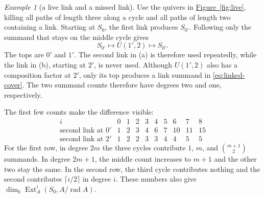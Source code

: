 \documentclass[reqno]{amsart}
\numberwithin{equation}{section}
\theoremstyle{definition}
\theoremstyle{remark}
\newtheorem{example}[theorem]{Example}
\DeclareMathOperator{\Ext}{Ext}
\DeclareMathOperator{\rad}{rad}
\newcommand{\kk}{\Bbbk}
\newcommand{\kdim}{\dim_{\kk}}
\newcommand{\figref}[1]{\hyperref[#1]{Figure~\ref*{#1}}}
\begin{document}
\begin{example}[a live link and a missed link]\label{ex:live}
Use the quivers in \figref{fig:live}, killing all paths of length three along a cycle and all paths of length two containing a link. Starting at \(S_0\), the first link produces \(S_{0'}\). Following only the summand that stays on the middle cycle gives
\[
S_{0'}\longmapsto U(1',2)\longmapsto S_{0'}.
\]
The tops are \(0'\) and \(1'\). The second link in (a) is therefore used repeatedly, while the link in (b), starting at \(2'\), is never used. Although \(U(1',2)\) also has a composition factor at \(2'\), only its top produces a link summand in \eqref{eq:linked-cover}. The two summand counts therefore have degrees two and one, respectively.

The first few counts make the difference visible:
\[
\begin{array}{c|rrrrrrrrr}
i&0&1&2&3&4&5&6&7&8\\ \hline
\text{second link at }0'&1&2&3&4&6&7&10&11&15\\
\text{second link at }2'&1&2&2&3&3&4&4&5&5
\end{array}
\]
For the first row, in degree \(2m\) the three cycles contribute \(1\), \(m\), and \(\binom{m+1}{2}\) summands. In degree \(2m+1\), the middle count increases to \(m+1\) and the other two stay the same. In the second row, the third cycle contributes nothing and the second contributes \(\lceil i/2\rceil\) in degree \(i\). These numbers also give \(\kdim\Ext_A^i(S_0,A/\rad A)\).
\end{example}
\end{document}

